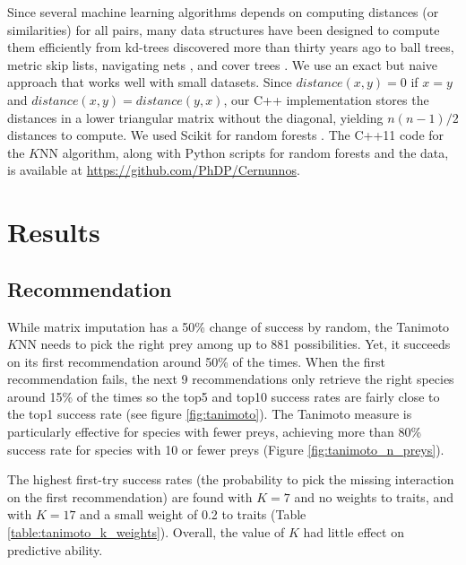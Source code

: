 \documentclass[letterpaper]{article}
\begin{document}
Since several machine learning algorithms depends on computing distances (or
similarities) for all pairs, many data structures have been designed to compute
them efficiently from kd-trees discovered more than thirty years ago
\cite{fri77} to ball trees, metric skip lists, navigating nets \cite{izb15},
and cover trees \cite{bey06,izb15}. We use an exact but naive approach that
works well with small datasets. Since $distance(x, y) = 0$ if $x = y$ and
$distance(x, y) = distance(y, x)$, our C++ implementation stores the distances
in a lower triangular matrix without the diagonal, yielding $n(n - 1)/2$
distances to compute. We used Scikit for random forests \cite{scikit-learn}.
The C++11 code for the $K$NN algorithm, along with Python scripts for random
forests and the data, is available at
\href{ttps://github.com/PhDP/Cernunnos}{https://github.com/PhDP/Cernunnos}.



\section{Results}

\subsection{Recommendation}

While matrix imputation has a 50\% change of success by random, the Tanimoto
$K$NN needs to pick the right prey among up to 881 possibilities. Yet, it
succeeds on its first recommendation around 50\% of the times. When the first
recommendation fails, the next 9 recommendations only retrieve the right
species around 15\% of the times so the top5 and top10 success rates are fairly
close to the top1 success rate (see figure \ref{fig:tanimoto}). The Tanimoto
measure is particularly effective for species with fewer preys, achieving more
than 80\% success rate for species with 10 or fewer preys (Figure
\ref{fig:tanimoto_n_preys}).

The highest first-try success rates (the probability to pick the missing
interaction on the first recommendation) are found with $K = 7$ and no weights
to traits, and with $K = 17$ and a small weight of 0.2 to traits (Table
\ref{table:tanimoto_k_weights}). Overall, the value of $K$ had little
effect on predictive ability.
\end{document}
